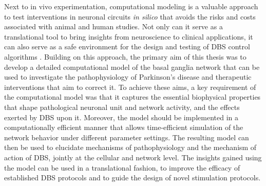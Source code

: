 
%
%
%
%
%
%
%
%
%

%
%
%

%
%
%
%
%
%
%
%
%
%
%
%
%

%
%
%
%
%
%
%

%
%
%
%
%
%
%
%

%
%

Next to in vivo experimentation, computational modeling is a valuable
approach to test interventions in neuronal circuits \textit{in silico} that avoids
the risks and costs associated with animal and human studies. Not only can it serve
as a translational tool to bring insights from neuroscience to clinical
applications, it can also serve as a safe environment for the design and
testing of DBS control algorithms \cite{modolo_model-driven_2011,beuter_closed-loop_2014,huys_computational_2016}.
Building on this approach, the primary aim of this thesis was to develop a detailed
computational model of the basal ganglia network that can be used to investigate the
pathophysiology of Parkinson’s disease and therapeutic interventions that aim to correct
it. To achieve these aims, a key requirement of the computational model was that it
captures the essential biophysical properties that shape pathological neuronal unit
and network activity, and the effects exerted by DBS upon it.
Moreover, the model should be implemented
in a computationally efficient manner that allows time-efficient simulation of the
network behavior under different parameter settings. The resulting model
can then be used to elucidate mechanisms of pathophysiology and the mechanism
of action of DBS, jointly at the cellular and network level.
The insights gained using the model can be used in a translational fashion, to improve
the efficacy of established DBS protocols and to guide the design of
novel stimulation protocols. %

